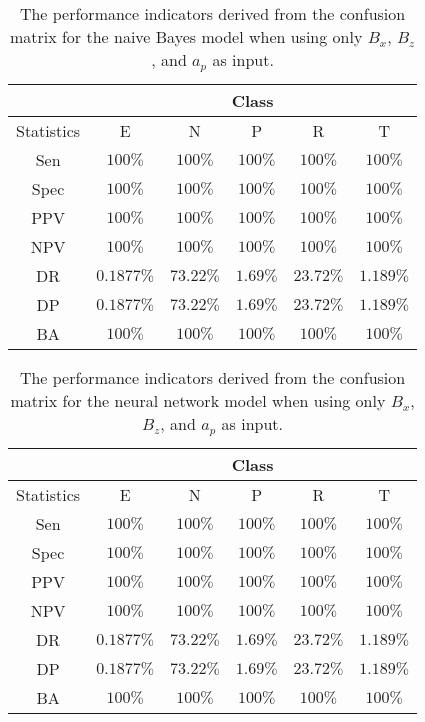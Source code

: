 \begin{table}[!ht]
	\centering
	\begin{tabular}{|c|c|c|c|c|c|}
		\hline
		 & \multicolumn{5}{c|}{Class} \\ \hline
		Statistics & E & N & P & R & T \\ \hline
		Sen & $100\%$ & $100\%$ & $100\%$ & $100\%$ & $100\%$ \\ \hline
		Spec & $100\%$ & $100\%$ & $100\%$ & $100\%$ & $100\%$ \\ \hline
		PPV & $100\%$ & $100\%$ & $100\%$ & $100\%$ & $100\%$ \\ \hline
		NPV & $100\%$ & $100\%$ & $100\%$ & $100\%$ & $100\%$ \\ \hline
		DR & $0.1877\%$ & $73.22\%$ & $1.69\%$ & $23.72\%$ & $1.189\%$ \\ \hline
		DP & $0.1877\%$ & $73.22\%$ & $1.69\%$ & $23.72\%$ & $1.189\%$ \\ \hline
		BA & $100\%$ & $100\%$ & $100\%$ & $100\%$ & $100\%$ \\ \hline
	\end{tabular}
	\caption{The performance indicators derived from the confusion matrix for the naive Bayes model when using only $B_{x}$, $B_{z}$, and $a_{p}$ as input.}
	\label{tab:cs:reverse:xzap:nb}
\end{table}

\begin{table}[!ht]
	\centering
	\begin{tabular}{|c|c|c|c|c|c|}
		\hline
		 & \multicolumn{5}{c|}{Class} \\ \hline
		Statistics & E & N & P & R & T \\ \hline
		Sen & $100\%$ & $100\%$ & $100\%$ & $100\%$ & $100\%$ \\ \hline
		Spec & $100\%$ & $100\%$ & $100\%$ & $100\%$ & $100\%$ \\ \hline
		PPV & $100\%$ & $100\%$ & $100\%$ & $100\%$ & $100\%$ \\ \hline
		NPV & $100\%$ & $100\%$ & $100\%$ & $100\%$ & $100\%$ \\ \hline
		DR & $0.1877\%$ & $73.22\%$ & $1.69\%$ & $23.72\%$ & $1.189\%$ \\ \hline
		DP & $0.1877\%$ & $73.22\%$ & $1.69\%$ & $23.72\%$ & $1.189\%$ \\ \hline
		BA & $100\%$ & $100\%$ & $100\%$ & $100\%$ & $100\%$ \\ \hline
	\end{tabular}
	\caption{The performance indicators derived from the confusion matrix for the neural network model when using only $B_{x}$, $B_{z}$, and $a_{p}$ as input.}
	\label{tab:cs:reverse:xzap:nnet}
\end{table}


